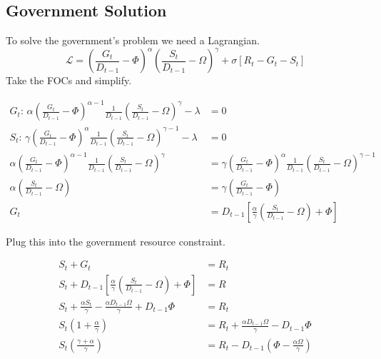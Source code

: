 \documentclass[12pt]{article}
\begin{document}
\begin{spacing}{1.5}
\subsection{Government Solution}

To solve the government's problem we need a Lagrangian.
\begin{equation}
\mathcal{L} = \left(\frac{G_t}{ D_{t-1}}-\Phi\right)^\alpha \left(\frac{S_t}{ D_{t-1}}-\Omega\right)^\gamma  +\sigma[R_t-G_t-S_t] 
\end{equation}
Take the FOCs and simplify.

\begin{equation}
    \begin{aligned}
        G_t\text{: } \alpha \left(\frac{G_t}{ D_{t-1}}-\Phi\right)^{\alpha-1} \frac{1}{ D_{t-1}} \left(\frac{S_t}{D_{t-1}}-\Omega\right)^\gamma  -\lambda &=0  \\
S_t\text{: } \gamma  \left(\frac{G_t}{ D_{t-1}}-\Phi\right)^{\alpha} \frac{1}{D_{t-1}} \left(\frac{S_t}{D_{t-1}}-\Omega\right)^{\gamma -1} -\lambda &=0 \\
\alpha \left(\frac{G_t}{D_{t-1}}-\Phi\right)^{\alpha-1} \frac{1}{ D_{t-1}} \left(\frac{S_t}{D_{t-1}}-\Omega\right)^\gamma  &= \gamma  \left(\frac{G_t}{ D_{t-1}}-\Phi\right)^{\alpha} \frac{1}{ D_{t-1}} \left(\frac{S_t}{ D_{t-1}}-\Omega\right)^{\gamma -1} \\
\alpha \left(\frac{S_t}{ D_{t-1}}-\Omega \right) &= \gamma  \left( \frac{G_t}{ D_{t-1}}-\Phi \right) \\
G_t&= D_{t-1}\left[\frac{\alpha}{\gamma } \left(\frac{S_t}{ D_{t-1}} -\Omega \right)+\Phi \right]
    \end{aligned}
\end{equation}


\noindent Plug this into the government resource constraint. 


\begin{equation}
    \begin{aligned}
        S_t+G_t&=R_t \\
        S_t+  D_{t-1}\left[\frac{\alpha}{\gamma } \left(\frac{S_t}{ D_{t-1}} -\Omega \right) +\Phi \right]  &= R \\
S_t+ \frac{\alpha S_t}{\gamma } -\frac{\alpha  D_{t-1} \Omega}{\gamma } +D_{t-1}\Phi &=R_t \\
S_t\left(1+\frac{\alpha}{\gamma }\right) &= R_t+ \frac{\alpha D_{t-1} \Omega}{\gamma } - D_{t-1}\Phi \\
S_t\left(\frac{\gamma  + \alpha}{\gamma }\right) &= R_t - D_{t-1} \left(\Phi - \frac{\alpha  \Omega}{\gamma } \right) 
    \end{aligned}
\end{equation}



\end{spacing}
\end{document}
